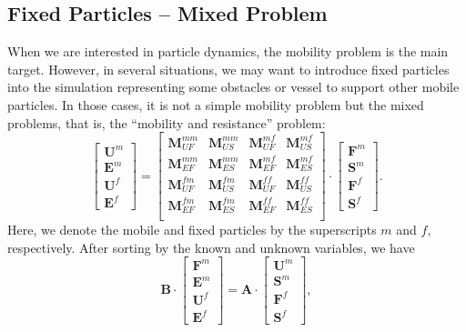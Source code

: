 \documentclass{book}
\begin{document}
\subsection{Fixed Particles -- Mixed Problem}
When we are interested in particle dynamics,
the mobility problem is the main target.
However, in several situations, we may want to introduce
fixed particles into the simulation representing some
obstacles or vessel to support other mobile particles.
\cite{IchikiHayakawa1995}
In those cases, it is not a simple mobility problem but
the mixed problems, that is,
the ``mobility and resistance'' problem:
\begin{equation}
  \left[
    \begin{array}{c}
      \bm{U}^{m}\\
      \bm{E}^{m}\\
      \bm{U}^{f}\\
      \bm{E}^{f}
    \end{array}
  \right]
  =
  \left[
    \begin{array}{cccc}
      \bm{M}_{UF}^{mm} & \bm{M}_{US}^{mm} & \bm{M}_{UF}^{mf} & \bm{M}_{US}^{mf}\\
      \bm{M}_{EF}^{mm} & \bm{M}_{ES}^{mm} & \bm{M}_{EF}^{mf} & \bm{M}_{ES}^{mf}\\
      \bm{M}_{UF}^{fm} & \bm{M}_{US}^{fm} & \bm{M}_{UF}^{ff} & \bm{M}_{US}^{ff}\\
      \bm{M}_{EF}^{fm} & \bm{M}_{ES}^{fm} & \bm{M}_{EF}^{ff} & \bm{M}_{ES}^{ff}\\
    \end{array}
  \right]
  \cdot
  \left[
    \begin{array}{c}
      \bm{F}^{m}\\
      \bm{S}^{m}\\
      \bm{F}^{f}\\
      \bm{S}^{f}
    \end{array}
  \right]
  .
\end{equation}
Here, we denote the mobile and fixed particles by
the superscripts $m$ and $f$, respectively.
After sorting by the known and unknown variables,
we have
\begin{equation}
  \bm{B}
  \cdot
  \left[
    \begin{array}{c}
      \bm{F}^{m}\\
      \bm{E}^{m}\\
      \bm{U}^{f}\\
      \bm{E}^{f}
    \end{array}
  \right]
  =
  \bm{A}
  \cdot
  \left[
    \begin{array}{c}
      \bm{U}^{m}\\
      \bm{S}^{m}\\
      \bm{F}^{f}\\
      \bm{S}^{f}
    \end{array}
  \right]
  ,
  \label{eq:atimes-gen}
\end{equation}
\end{document}
